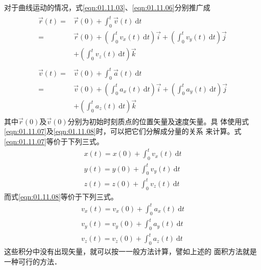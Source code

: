 对于曲线运动的情况，式\eqref{eqn:01.11.03}、\eqref{eqn:01.11.06}分别推广成
{\setlength{\mathindent}{4em}
\begin{eqnarray}
 \label{eqn:01.11.07}
 \begin{aligned}
 \vec{r}\left(t\right)= & \vec{r}\left(0\right)+\int_{0}^{t} \vec{v}\left(t\right) {~\mathrm d} t \\
 = & \vec{r}\left(0\right)
 +\left(\int_{0}^{t} v_{x}\left(t\right) {~\mathrm d} t\right) \vec{i}
 +\left(\int_{0}^{t} v_{y}\left(t\right) {~\mathrm d} t\right) \vec{j} \\
 & +\left(\int_{0}^{t} v_{z}\left(t\right) {~\mathrm d} t\right) \vec{k}
 \end{aligned} \\
 \label{eqn:01.11.08}
 \begin{aligned}
 \vec{v}\left(t\right)= & \vec{v}\left(0\right)+\int_{0}^{t} \vec{a}\left(t\right) {~\mathrm d} t \\
 = & \vec{v}\left(0\right)
 +\left(\int_{0}^{t} a_{x}\left(t\right) {~\mathrm d} t\right) \vec{i}
 +\left(\int_{0}^{t} a_{y}\left(t\right) {~\mathrm d} t\right) \vec{j} \\
 & +\left(\int_{0}^{t} a_{z}\left(t\right) {~\mathrm d} t\right) \vec{k}
 \end{aligned}
\end{eqnarray}
\setlength{\mathindent}{6em}}%
其中$\vec{r}\left(0\right)$及$\vec{v}\left(0\right)$分别为初始时刻质点的位置矢量及速度矢量。具
体使用式\eqref{eqn:01.11.07}及\eqref{eqn:01.11.08}时，可以把它们分解成分量的关系
来计算。式\eqref{eqn:01.11.07}等价于下列三式。
{%
\begin{equation}
 \begin{aligned}\label{eqn:01.11.09}
 x\left(t\right)=x\left(0\right)+\int_{0}^{t} v_{x}\left(t\right) {~\mathrm d} t \\
 y\left(t\right)=y\left(0\right)+\int_{0}^{t} v_{y}\left(t\right) {~\mathrm d} t \\
 z\left(t\right)=z\left(0\right)+\int_{0}^{t} v_{z}\left(t\right) {~\mathrm d} t
 \end{aligned}
\end{equation}}%
而式\eqref{eqn:01.11.08}等价于下列三式。
{%
\begin{equation}\label{eqn:01.11.10}
 \begin{aligned}
 v_x\left(t\right)=v_x\left(0\right)+\int_{0}^{t} a_{x}\left(t\right) {~\mathrm d} t \\
 v_y\left(t\right)=v_y\left(0\right)+\int_{0}^{t} a_{y}\left(t\right) {~\mathrm d} t \\
 v_z\left(t\right)=v_z\left(0\right)+\int_{0}^{t} a_{z}\left(t\right) {~\mathrm d} t
 \end{aligned}
\end{equation}}%
这些积分中没有出现矢量，就可以按一一般方法计算，譬如上述的
面积方法就是一种可行的方法．

